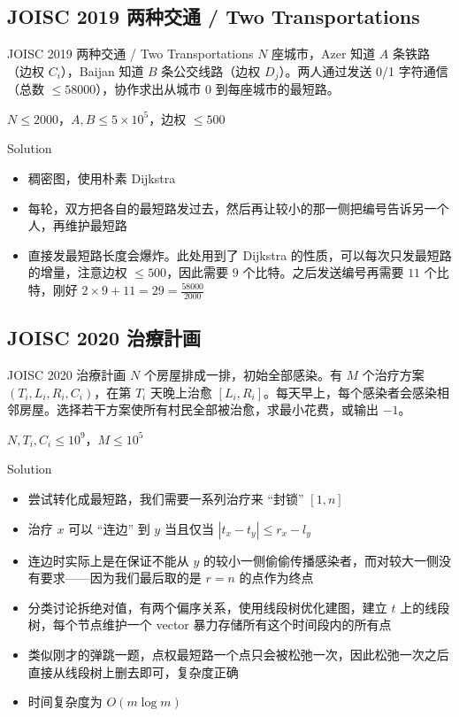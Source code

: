 ﻿\documentclass[aspectratio=169]{ctexbeamer}
\begin{document}
\subsection{JOISC 2019 两种交通 / Two Transportations}

\begin{frame}{JOISC 2019 两种交通 / Two Transportations}
      $N$ 座城市，Azer 知道 $A$ 条铁路（边权 $C_i$），Baijan 知道 $B$ 条公交线路（边权 $D_j$）。两人通过发送 0/1 字符通信（总数 $\le 58000$），协作求出从城市 $0$ 到每座城市的最短路。
      
      $N\le 2000$，$A,B\le 5\times 10^5$，边权 $\le 500$
\end{frame}

\begin{frame}{Solution}
    \begin{itemize}
        \item 稠密图，使用朴素 Dijkstra
        \item 每轮，双方把各自的最短路发过去，然后再让较小的那一侧把编号告诉另一个人，再维护最短路
        \item 直接发最短路长度会爆炸。此处用到了 Dijkstra 的性质，可以每次只发最短路的增量，注意边权 $\le 500$，因此需要 $ 9 $ 个比特。之后发送编号再需要 $11$ 个比特，刚好 $2\times 9+11=29=\frac{58000}{2000}$
    \end{itemize}
\end{frame}




\subsection{JOISC 2020 治療計画}

\begin{frame}{JOISC 2020 治療計画}
      $N$ 个房屋排成一排，初始全部感染。有 $M$ 个治疗方案 $(T_i,L_i,R_i,C_i)$，在第 $T_i$ 天晚上治愈 $[L_i,R_i]$。每天早上，每个感染者会感染相邻房屋。选择若干方案使所有村民全部被治愈，求最小花费，或输出 $-1$。
      
      $N,T_i,C_i\le 10^9$，$M\le 10^5$
\end{frame}

\begin{frame}{Solution}
    \begin{itemize}
        \item 尝试转化成最短路，我们需要一系列治疗来 “封锁” $[1,n]$
        \item 治疗 $x$ 可以 “连边” 到 $y$ 当且仅当 $|t_x-t_y|\le r_x-l_y$
        \item 连边时实际上是在保证不能从 $y$ 的较小一侧偷偷传播感染者，而对较大一侧没有要求——因为我们最后取的是 $r=n$ 的点作为终点
        \item 分类讨论拆绝对值，有两个偏序关系，使用线段树优化建图，建立 $t$ 上的线段树，每个节点维护一个 vector 暴力存储所有这个时间段内的所有点
        \item 类似刚才的弹跳一题，点权最短路一个点只会被松弛一次，因此松弛一次之后直接从线段树上删去即可，复杂度正确
        \item 时间复杂度为 $O(m\log m)$
    \end{itemize}
\end{frame}
\end{document}
